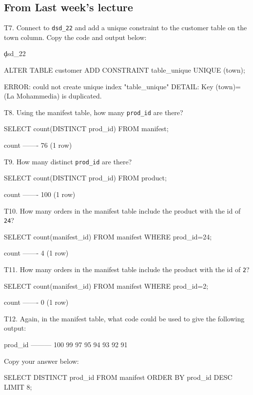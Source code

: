 \subsection*{From Last week's lecture}
T7. Connect to \verb|dsd_22| and add a unique constraint to the customer table on the town column. Copy the code and output below:
\begin{sql}
\c dsd_22

ALTER TABLE customer ADD CONSTRAINT table_unique UNIQUE (town);
\end{sql}
\begin{pseudo*}
ERROR:  could not create unique index "table_unique"
DETAIL:  Key (town)=(La Mohammedia) is duplicated.
\end{pseudo*}

T8. Using the manifest table, how many \verb|prod_id| are there?
\begin{sql}
SELECT count(DISTINCT prod_id) FROM manifest;
\end{sql}
\begin{pseudo}
 count
-------
    76
(1 row)
\end{pseudo}

T9. How many distinct \verb|prod_id| are there?
\begin{sql}
SELECT count(DISTINCT prod_id) FROM product; 
\end{sql}
\begin{pseudo}
 count
-------
   100
(1 row)
\end{pseudo}

T10. How many orders in the manifest table include the product with the id of \verb|24|?
\begin{sql}
SELECT count(manifest_id) FROM manifest
WHERE prod_id=24;
\end{sql}
\begin{pseudo}
 count
-------
     4
(1 row)
\end{pseudo}

T11. How many orders in the manifest table include the product with the id of \verb|2|?
\begin{sql}
SELECT count(manifest_id) FROM manifest
WHERE prod_id=2;
\end{sql}
\begin{pseudo}
 count
-------
     0
(1 row)
\end{pseudo}

T12. Again, in the manifest table, what code could be used to give the following output:
\begin{pseudo}
prod_id 
---------
     100
      99
      97
      95
      94
      93
      92
      91
\end{pseudo}
Copy your answer below:
\begin{sql}
SELECT DISTINCT prod_id FROM manifest
ORDER BY prod_id DESC
LIMIT 8;
\end{sql}

